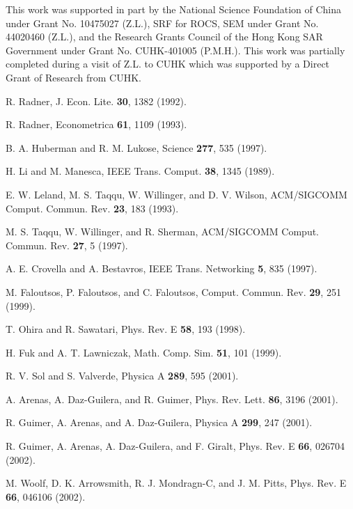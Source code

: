 \documentclass[aps,prl,twocolumn,superscriptaddress,showpacs]{revtex4}
\begin{document}
\acknowledgments This work was supported in part by the National
Science Foundation of China under Grant No. 10475027 (Z.L.), SRF
for ROCS, SEM under Grant No. 44020460 (Z.L.), and the Research
Grants Council of the Hong Kong SAR Government under Grant No.
CUHK-401005 (P.M.H.). This work was partially completed during a
visit of Z.L. to CUHK which was supported by a Direct Grant of
Research from CUHK.

\begin{references}

R. Radner, J. Econ. Lite. {\bf 30}, 1382 (1992).

R. Radner, Econometrica {\bf 61}, 1109 (1993).

B. A. Huberman and R. M. Lukose, Science {\bf 277}, 535 (1997).

H. Li and M. Manesca, IEEE Trans. Comput. {\bf 38}, 1345 (1989).

E. W. Leland, M. S. Taqqu, W. Willinger, and D. V. Wilson,
ACM/SIGCOMM Comput. Commun. Rev. {\bf 23}, 183 (1993).

M. S. Taqqu, W. Willinger, and R. Sherman,
ACM/SIGCOMM Comput. Commun. Rev. {\bf 27}, 5 (1997).

A. E. Crovella and A. Bestavros, IEEE Trans. Networking
{\bf 5}, 835 (1997).

M. Faloutsos, P. Faloutsos, and C. Faloutsos,
Comput. Commun. Rev. {\bf 29}, 251 (1999).

T. Ohira and R. Sawatari, Phys. Rev. E {\bf 58}, 193 (1998).

H. Fuk and A. T. Lawniczak, Math. Comp. Sim. {\bf 51}, 101 (1999).

R. V. Sol and S. Valverde, Physica A {\bf 289}, 595
(2001).

A. Arenas, A. Daz-Guilera, and R. Guimer,
Phys. Rev. Lett. {\bf 86}, 3196 (2001).

R. Guimer, A. Arenas, and A. Daz-Guilera,
Physica A {\bf 299}, 247 (2001).

R. Guimer, A. Arenas, A. Daz-Guilera, and F. Giralt,
Phys. Rev. E {\bf 66}, 026704 (2002).

M. Woolf, D. K. Arrowsmith, R. J. Mondragn-C, and J. M. Pitts,
Phys. Rev. E {\bf 66}, 046106 (2002).


\end{references}
\end{document}
